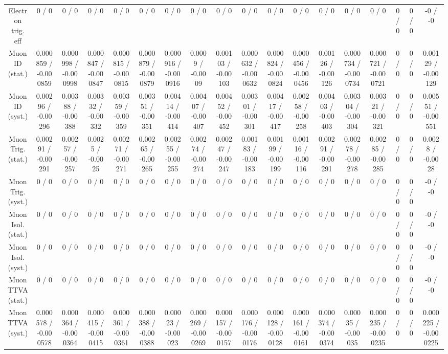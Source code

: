 \documentclass[10pt]{article}
\begin{document}
\begin{table}[htbp]
\begin{center}
\begin{tabular}{|c|c|c|c|c|c|c|c|c|c|c|c|c|c|c|c|c|c|}
  Electron trig. eff & 0 / 0 & 0 / 0 & 0 / 0 & 0 / 0 & 0 / 0 & 0 / 0 & 0 / 0 & 0 / 0 & 0 / 0 & 0 / 0 & 0 / 0 & 0 / 0 & 0 / 0 & 0 / 0 & 0 / 0 & 0 / 0 & -0 / -0 \\ 
  Muon ID (stat.) & 0.000859 / -0.000859 & 0.000998 / -0.000998 & 0.000847 / -0.000847 & 0.000815 / -0.000815 & 0.000879 / -0.000879 & 0.000916 / -0.000916 & 0.0009 / -0.0009 & 0.00103 / -0.00103 & 0.000632 / -0.000632 & 0.000824 / -0.000824 & 0.000456 / -0.000456 & 0.00126 / -0.00126 & 0.000734 / -0.000734 & 0.000721 / -0.000721 & 0 / 0 & 0 / 0 & 0.00129 / -0.00129 \\ 
  Muon ID (syst.) & 0.00296 / -0.00296 & 0.00388 / -0.00388 & 0.00332 / -0.00332 & 0.00359 / -0.00359 & 0.00351 / -0.00351 & 0.00414 / -0.00414 & 0.00407 / -0.00407 & 0.00452 / -0.00452 & 0.00301 / -0.00301 & 0.00417 / -0.00417 & 0.00258 / -0.00258 & 0.00403 / -0.00403 & 0.00304 / -0.00304 & 0.00321 / -0.00321 & 0 / 0 & 0 / 0 & 0.00551 / -0.00551 \\ 
  Muon Trig. (stat.) & 0.00291 / -0.00291 & 0.00257 / -0.00257 & 0.0025 / -0.0025 & 0.00271 / -0.00271 & 0.00265 / -0.00265 & 0.00255 / -0.00255 & 0.00274 / -0.00274 & 0.00247 / -0.00247 & 0.00183 / -0.00183 & 0.00199 / -0.00199 & 0.00116 / -0.00116 & 0.00291 / -0.00291 & 0.00278 / -0.00278 & 0.00285 / -0.00285 & 0 / 0 & 0 / 0 & 0.0028 / -0.0028 \\ 
  Muon Trig. (syst.) & 0 / 0 & 0 / 0 & 0 / 0 & 0 / 0 & 0 / 0 & 0 / 0 & 0 / 0 & 0 / 0 & 0 / 0 & 0 / 0 & 0 / 0 & 0 / 0 & 0 / 0 & 0 / 0 & 0 / 0 & 0 / 0 & -0 / -0 \\ 
  Muon Isol. (stat.) & 0 / 0 & 0 / 0 & 0 / 0 & 0 / 0 & 0 / 0 & 0 / 0 & 0 / 0 & 0 / 0 & 0 / 0 & 0 / 0 & 0 / 0 & 0 / 0 & 0 / 0 & 0 / 0 & 0 / 0 & 0 / 0 & -0 / -0 \\ 
  Muon Isol. (syst.) & 0 / 0 & 0 / 0 & 0 / 0 & 0 / 0 & 0 / 0 & 0 / 0 & 0 / 0 & 0 / 0 & 0 / 0 & 0 / 0 & 0 / 0 & 0 / 0 & 0 / 0 & 0 / 0 & 0 / 0 & 0 / 0 & -0 / -0 \\ 
  Muon TTVA (stat.) & 0 / 0 & 0 / 0 & 0 / 0 & 0 / 0 & 0 / 0 & 0 / 0 & 0 / 0 & 0 / 0 & 0 / 0 & 0 / 0 & 0 / 0 & 0 / 0 & 0 / 0 & 0 / 0 & 0 / 0 & 0 / 0 & -0 / -0 \\ 
  Muon TTVA (syst.) & 0.000578 / -0.000578 & 0.000364 / -0.000364 & 0.000415 / -0.000415 & 0.000361 / -0.000361 & 0.000388 / -0.000388 & 0.00023 / -0.00023 & 0.000269 / -0.000269 & 0.000157 / -0.000157 & 0.000176 / -0.000176 & 0.000128 / -0.000128 & 0.000161 / -0.000161 & 0.000374 / -0.000374 & 0.00035 / -0.00035 & 0.000235 / -0.000235 & 0 / 0 & 0 / 0 & 0.000225 / -0.000225 \\ 

\end{tabular}
\end{center}
\end{table}
\end{document}
